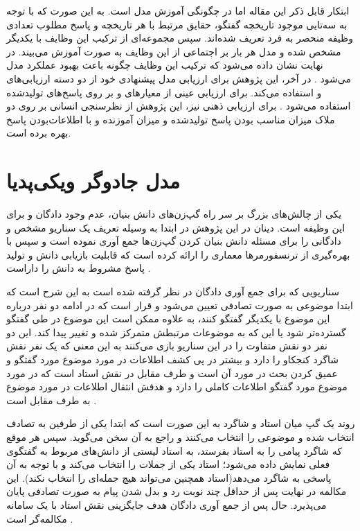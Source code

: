 ابتکار قابل ذکر این مقاله اما در چگونگی آموزش مدل است. به این صورت که با توجه به سه‌تایی موجود تاریخچه گفتگو، حقایق مرتبط با هر تاریخچه و پاسخ مطلوب تعدادی وظیفه منحصر به فرد تعریف شده‌اند. سپس مجموعه‌ای از ترکیب این وظایف با یکدیگر مشخص شده و مدل هر بار بر اجتماعی از این وظایف به صورت 
آموزش می‌بیند. در نهایت نشان داده می‌شود که ترکیب این وظایف چگونه باعث بهبود عملکرد مدل می‌شود
\cite{a_knowledge_grounded}
.
در آخر، این پژوهش برای ارزیابی مدل پیشنهادی خود از دو دسته ارزیابی‌های
و
استفاده می‌کند.
برای ارزیابی عینی از معیار‌های
و
بر روی پاسخ‌های تولیدشده استفاده می‌شود
\cite{papineni-etal-2002-bleu}
. برای ارزیابی ذهنی نیز، این پژوهش از نظرسنجی انسانی بر روی دو ملاک میزان مناسب بودن پاسخ تولیدشده و میزان آموزنده و با اطلاعات‌بودن پاسخ بهره برده است.


\section{مدل جادوگر ویکی‌پدیا}\label{chap2:intro:wizard}

یکی از چالش‌های بزرگ بر سر راه گپ‌زن‌های دانش بنیان، عدم وجود دادگان و 
برای این وظیفه است. 
دینان در این پژوهش
در ابتدا به وسیله تعریف یک سناریو مشخص و 
دادگانی را برای مسئله دانش بنیان کردن گپ‌زن‌ها جمع آوری نموده است و سپس با بهره‌گیری از ترنسفورمر‌ها 
معماری را ارائه کرده است که قابلیت بازیابی دانش و تولید پاسخ مشروط به دانش را داراست
\cite{wizard}. 

سناریویی که برای جمع آوری دادگان در نظر گرفته شده است به این شرح است که ابتدا موضوعی به صورت تصادفی تعیین می‌شود و قرار است که در ادامه دو نفر درباره این موضوع با یکدیگر گفتگو کنند، به علاوه ممکن است این موضوع در طی گفتگو گسترده‌تر شود یا این که به موضوعات مرتبطش متمرکز شده و تغییر پیدا کند. این دو نفر دو نقش متفاوت را در این سناریو بازی می‌کنند به این معنی که یک نفر نقش شاگرد کنجکاو را دارد و بیشتر در پی کشف اطلاعات در مورد موضوع مورد گفتگو و عمیق کردن بحث در مورد آن است و طرف مقابل در نقش استاد است که در مورد موضوع مورد گفتگو اطلاعات کاملی را دارد و هدفش انتقال اطلاعات در مورد موضوع به طرف مقابل است
\cite{wizard}.

روند یک گپ‌ میان استاد و شاگرد به این صورت است که ابتدا یکی از طرفین به تصادف انتخاب شده و موضوعی را انتخاب می‌کنند و راجع به آن سخن می‌گوید. سپس هر موقع که شاگرد پیامی را به استاد بفرستد، به استاد لیستی از دانش‌های مربوط به گفتگوی فعلی نمایش‌ داده می‌شود؛ استاد یکی از جملات را انتخاب می‌کند و با توجه به آن پاسخی به شاگرد می‌دهد(استاد همچنین می‌تواند هیچ جمله‌ای را انتخاب نکند).
این مکالمه در نهایت پس از حداقل چند نوبت رد و بدل شدن پیام به صورت تصادفی پایان می‌پذیرد.
حال پس از جمع‌ آوری دادگان هدف جایگزینی نقش استاد با یک سامانه مکالمه‌گر است
\cite{wizard}
.

